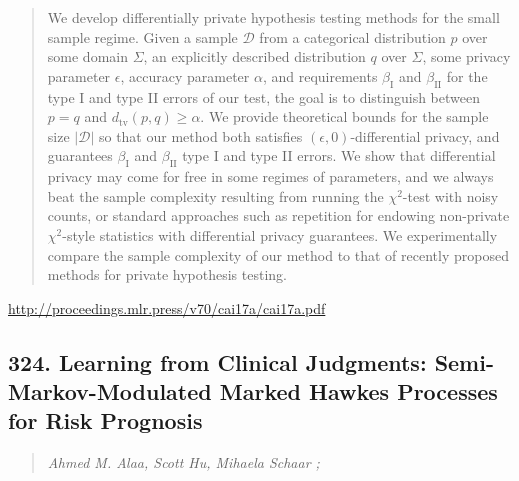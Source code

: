 \documentclass{article}
\begin{document}
\begin{quote}
    We develop differentially private hypothesis testing methods for the small sample regime. Given a sample $\mathcal{D}$ from a categorical distribution $p$ over some domain $\Sigma$, an explicitly described distribution $q$ over $\Sigma$, some privacy parameter $\epsilon$, accuracy parameter $\alpha$, and requirements $\beta_\mathrm{I}$ and $\beta_\mathrm{II}$ for the type I and type II errors of our test, the goal is to distinguish between $p=q$ and $d_\mathrm{tv}(p,q) \ge \alpha$. We provide theoretical bounds for the sample size $|\mathcal{D}|$ so that our method both satisfies $(\epsilon,0)$-differential privacy, and guarantees $\beta_\mathrm{I}$ and $\beta_\mathrm{II}$ type I and type II errors. We show that differential privacy may come for free in some regimes of parameters, and we always beat the sample complexity resulting from running the $\chi^2$-test with noisy counts, or standard approaches such as repetition for endowing non-private $\chi^2$-style statistics with differential privacy guarantees. We experimentally compare the sample complexity of our method to that of recently proposed methods for private hypothesis testing.  \end{quote}

\href{http://proceedings.mlr.press/v70/cai17a/cai17a.pdf}{http://proceedings.mlr.press/v70/cai17a/cai17a.pdf}

\subsection{324. Learning from Clinical Judgments: Semi-Markov-Modulated Marked Hawkes Processes for Risk Prognosis}

\begin{quote}
\footnotesize{\textit{Ahmed M. Alaa, Scott Hu, Mihaela Schaar ;}}
\end{quote}
\end{document}
